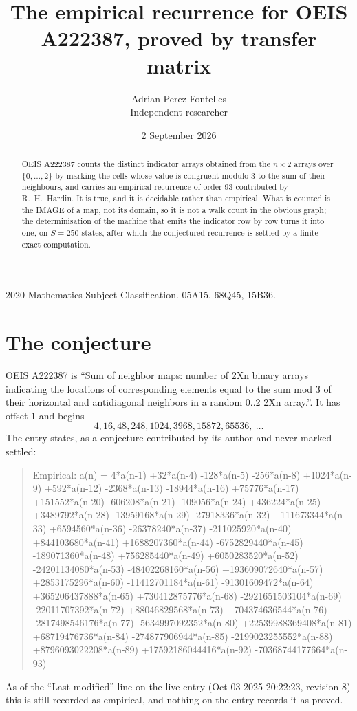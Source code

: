 \documentclass[11pt,a4paper]{article}
\title{The empirical recurrence for OEIS A222387, proved by transfer matrix}
\author{Adrian Perez Fontelles\\ \small Independent researcher}
\date{2 September 2026}
\theoremstyle{plain}
\theoremstyle{definition}
\begin{document}
\maketitle

\begin{abstract}
OEIS A222387 counts the distinct indicator arrays obtained from the $n\times2$ arrays over
$\{0,\dots,2\}$ by marking the cells whose value is congruent modulo 3 to the sum of their neighbours, and carries an
empirical recurrence of order $93$ contributed by R.~H.~Hardin. It is true, and it is
decidable rather than empirical. What is counted is the IMAGE of a map, not its domain, so it
is not a walk count in the obvious graph; the determinisation of the machine that emits the
indicator row by row turns it into one, on $S=250$ states, after which the conjectured
recurrence is settled by a finite exact computation.
\end{abstract}

\noindent\small 2020 Mathematics Subject Classification. 05A15, 68Q45, 15B36.\normalsize

\section{The conjecture}

OEIS A222387 is ``Sum of neighbor maps: number of 2Xn binary arrays indicating the locations of corresponding elements equal to the sum mod 3 of their horizontal and antidiagonal neighbors in a random 0..2 2Xn array.''. It has offset $1$ and begins
\[
4, 16, 48, 248, 1024, 3968, 15872, 65536,\ \dots
\]
The entry states, as a conjecture contributed by its author and never marked settled:
\begin{quote}
Empirical: a(n) = 4*a(n-1) +32*a(n-4) -128*a(n-5) -256*a(n-8) +1024*a(n-9) +592*a(n-12) -2368*a(n-13) -18944*a(n-16) +75776*a(n-17) +151552*a(n-20) -606208*a(n-21) -109056*a(n-24) +436224*a(n-25) +3489792*a(n-28) -13959168*a(n-29) -27918336*a(n-32) +111673344*a(n-33) +6594560*a(n-36) -26378240*a(n-37) -211025920*a(n-40) +844103680*a(n-41) +1688207360*a(n-44) -6752829440*a(n-45) -189071360*a(n-48) +756285440*a(n-49) +6050283520*a(n-52) -24201134080*a(n-53) -48402268160*a(n-56) +193609072640*a(n-57) +2853175296*a(n-60) -11412701184*a(n-61) -91301609472*a(n-64) +365206437888*a(n-65) +730412875776*a(n-68) -2921651503104*a(n-69) -22011707392*a(n-72) +88046829568*a(n-73) +704374636544*a(n-76) -2817498546176*a(n-77) -5634997092352*a(n-80) +22539988369408*a(n-81) +68719476736*a(n-84) -274877906944*a(n-85) -2199023255552*a(n-88) +8796093022208*a(n-89) +17592186044416*a(n-92) -70368744177664*a(n-93)
\end{quote}
As of the ``Last modified'' line on the live entry (Oct 03 2025 20:22:23, revision 8) this is still
recorded as empirical, and nothing on the entry records it as proved.
\end{document}
